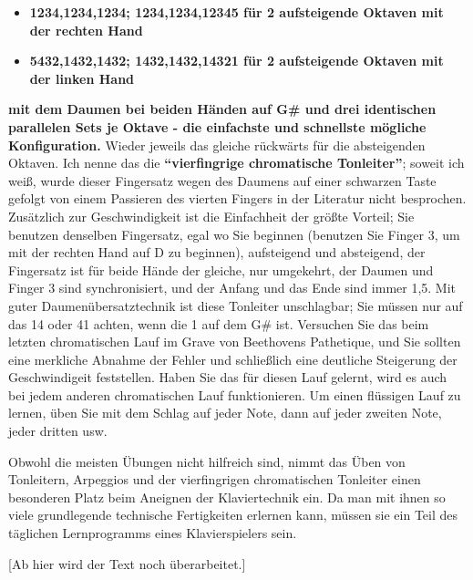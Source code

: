 \begin{itemize} 
 \item \textbf{1234,1234,1234; 1234,1234,12345 für 2 aufsteigende Oktaven mit der rechten Hand}
 \item \textbf{5432,1432,1432; 1432,1432,14321 für 2 aufsteigende Oktaven mit der linken Hand}
 \end{itemize}
\textbf{mit dem Daumen bei beiden Händen auf G\# und drei identischen parallelen Sets je Oktave - die einfachste und schnellste mögliche Konfiguration.}
Wieder jeweils das gleiche rückwärts für die absteigenden Oktaven.
Ich nenne das die \textbf{\enquote{vierfingrige chromatische Tonleiter}}; soweit ich weiß, wurde dieser Fingersatz wegen des Daumens auf einer schwarzen Taste gefolgt von einem Passieren des vierten Fingers in der Literatur nicht besprochen.
Zusätzlich zur Geschwindigkeit ist die Einfachheit der größte Vorteil; Sie benutzen denselben Fingersatz, egal wo Sie beginnen (benutzen Sie Finger 3, um mit der rechten Hand auf D zu beginnen), aufsteigend und absteigend, der Fingersatz ist für beide Hände der gleiche, nur umgekehrt, der Daumen und Finger 3 sind synchronisiert, und der Anfang und das Ende sind immer 1,5.  
Mit guter Daumenübersatztechnik ist diese Tonleiter unschlagbar; Sie müssen nur auf das 14 oder 41 achten, wenn die 1 auf dem G\# ist.
Versuchen Sie das beim letzten chromatischen Lauf im Grave von Beethovens Pathetique, und Sie sollten eine merkliche Abnahme der Fehler und schließlich eine deutliche Steigerung der Geschwindigeit feststellen.
Haben Sie das für diesen Lauf gelernt, wird es auch bei jedem anderen chromatischen Lauf funktionieren.
Um einen flüssigen Lauf zu lernen, üben Sie mit dem Schlag auf jeder Note, dann auf jeder zweiten Note, jeder dritten usw.

Obwohl die meisten Übungen nicht hilfreich sind, nimmt das Üben von Tonleitern, Arpeggios und der vierfingrigen chromatischen Tonleiter einen besonderen Platz beim Aneignen der Klaviertechnik ein.
Da man mit ihnen so viele grundlegende technische Fertigkeiten erlernen kann, müssen sie ein Teil des täglichen Lernprogramms eines Klavierspielers sein.


[Ab hier wird der Text noch überarbeitet.]



